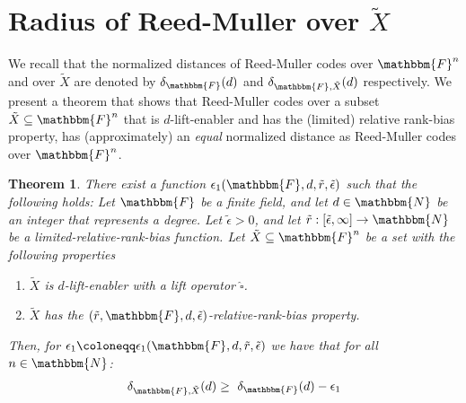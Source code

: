 \documentclass[10pt,a4paper]{article}
\newtheorem{theorem}{Theorem}[section]
\newcommand{\definedas}[0]{\coloneqq}
\newcommand{\basefield}[0]{\mathbbm{F}}
\newcommand{\blocklength}[0]{n}
\newcommand{\field}[0]{\basefield^{\blocklength}}
\newcommand{\degree}[0]{d}
\newcommand{\funcdef}[3]{#1:#2\rightarrow#3}
\newcommand{\naturalnumbersset}[0]{\mathbbm{N}}
\newcommand{\variety}{{\tilde{X}}}
\newcommand{\titlevariety}{\texorpdfstring{$\variety$}{X}}
\newcommand{\lift}[1]{\widehat{#1}}
\newcommand{\rankbiasfunc}[0]{{\tilde{r}}}
\newcommand{\epsilonlimitedrankbias}[0]{{\tilde{\epsilon}}}
\newcommand{\normalizedcodedistance}[2]{\delta_{#1}(#2)}
\newcommand{\normalizedcodedistanceex}[3]{\delta_{#1, #2}(#3)}
\begin{document}
\section[Radius of Reed-Muller over \titlevariety]{Radius of Reed-Muller over \titlevariety}\label{sec:radius-of-RM-over-X}
We recall that the normalized distances of Reed-Muller codes over $\field$ and over $\variety$
are denoted by $\normalizedcodedistance{\basefield}{\degree}$ and $\normalizedcodedistanceex{\basefield}{\variety}{\degree}$ respectively.
We present a theorem that shows that Reed-Muller codes over a subset $\variety \subseteq \field$ that is $\degree$-lift-enabler and has the (limited) relative rank-bias property,
has (approximately) an \emph{equal} normalized distance as Reed-Muller codes over $\field$.

\begin{theorem}\label{thm:distance-of-RM-in-X}
    There exist a function $\epsilon_1(\basefield, \degree, \rankbiasfunc, \epsilonlimitedrankbias)$  such that the following holds:
    Let $\basefield$ be a finite field, and let $\degree \in \naturalnumbersset$ be an integer that represents a degree.
    Let $\epsilonlimitedrankbias > 0$, and let $\funcdef{\rankbiasfunc}{[\epsilonlimitedrankbias, \infty]}{\naturalnumbersset}$ be a limited-relative-rank-bias function.
    \newline
    Let $\variety \subseteq \field$ be a set with the following properties
    \begin{enumerate}
        \item $\variety$ is $\degree$-lift-enabler with a lift operator $\lift{\square}$.
        \item $\variety$ has the $(\rankbiasfunc, \basefield, \degree, \epsilonlimitedrankbias)$-relative-rank-bias property.
    \end{enumerate}
    Then, for $\epsilon_1 \definedas \epsilon_1(\basefield, \degree, \rankbiasfunc, \epsilonlimitedrankbias)$ we have that for all $\blocklength \in \naturalnumbersset$:
    \[
        \normalizedcodedistanceex{\basefield}{\variety}{\degree} \geq \
        \normalizedcodedistance{\basefield}{\degree} - \epsilon_1
    \]
\end{theorem}
\end{document}
